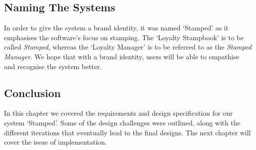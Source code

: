\subsection{Naming The Systems}
In order to give the system a brand identity, it was named `Stamped' as it emphasises the software's focus on stamping. The `Loyalty Stampbook' is to be called \emph{Stamped}, whereas the `Loyalty Manager' is to be referred to as the \emph{Stamped Manager}. We hope that with a brand identity, users will be able to empathise and recognise the system better.
\subsection{Conclusion}
In this chapter we covered the requirements and design specification for our system `Stamped'. Some of the design challenges were outlined, along with the different iterations that eventually lead to the final designs. The next chapter will cover the issue of implementation.
